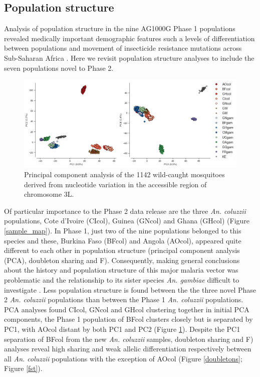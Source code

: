 \documentclass[a4paper,11pt,abstracton,hidelinks]{scrartcl}
\begin{document}
\subsection*{Population structure}

Analysis of population structure in the nine AG1000G Phase 1 populations revealed medically important demographic features such a levels of differentiation between populations and movement of insecticide resistance mutations across Sub-Saharan Africa \cite{Ag1000gConsortium2017}.
% 
Here we revisit population structure analyses to include the seven populations novel to Phase 2.

\begin{figure}[H]
	\begin{center}
		\includegraphics*[width=6.3in]{artwork/pca_3L_main_text.jpeg}
	\end{center}
	\caption{Principal component analysis of the 1142 wild-caught mosquitoes derived from nucleotide variation in the accessible region of chromosome 3L.}
	\label{pca}
\end{figure}

%
Of particular importance to the Phase 2 data release are the three \textit{An. coluzzii} populations, Cote d'Ivoire (CIcol), Guinea (GNcol) and Ghana (GHcol) (Figure \ref{sample_map}). 
%
In Phase 1, just two of the nine populations belonged to this species and these, Burkina Faso (BFcol) and Angola (AOcol), appeared quite different to each other in population structure (principal component analysis (PCA), doubleton sharing and F).
%
Consequently, making general conclusions about the history and population structure of this major malaria vector was problematic and the relationship to its sister species \textit{An. gambiae} difficult to investigate \cite{Ag1000gConsortium2017}.
%
Less population structure is found between the the three novel Phase 2 \textit{An. coluzzii} populations than between the Phase 1 \textit{An. coluzzii} populations.
%
PCA analyses found CIcol, GNcol and GHcol clustering together in initial PCA components, the Phase 1 population of BFcol clusters closely but is separated by PC1, with AOcol distant by both PC1 and PC2 (Figure \ref{pca}).
%
Despite the PC1 separation of BFcol from the new \textit{An. coluzzii} samples, doubleton sharing and F) analyses
reveal high sharing and weak allelic differentiation respectively between all \textit{An. coluzzii} populations with the exception of AOcol (Figure \ref{doubletons}; Figure \ref{fst}).
\end{document}
